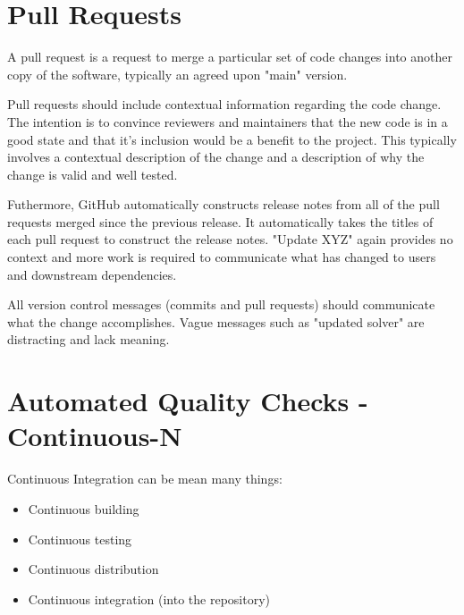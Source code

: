 \documentclass[]{nrel}
\begin{document}
\section{Pull Requests}
A pull request is a request to merge a particular set of code changes into another copy of the
software, typically an agreed upon "main" version.

Pull requests should include contextual information regarding the code change. The intention is
to convince reviewers and maintainers that the new code is in a good state and that it’s
inclusion would be a benefit to the project. This typically involves a contextual description of
the change and a description of why the change is valid and well tested.

Futhermore, GitHub automatically constructs release notes from all of the pull requests merged
since the previous release.
It automatically takes the titles of each pull request to construct the release notes.
"Update XYZ" again provides no context and more work is required to communicate what has changed
to users and downstream dependencies.

All version control messages (commits and pull requests) should communicate what the change
accomplishes.
Vague messages such as "updated solver" are distracting and lack meaning.


\section{Automated Quality Checks - Continuous-N}
Continuous Integration can be mean many things:
\begin{itemize}
\item Continuous building

\item Continuous testing

\item Continuous distribution

\item Continuous integration (into the repository)

\end{itemize}




\end{document}
